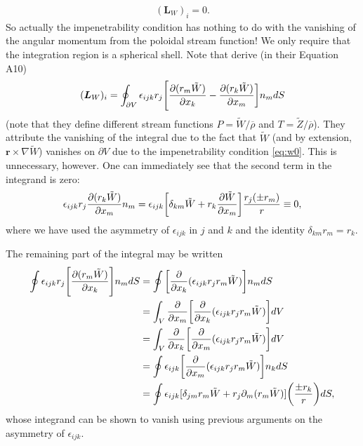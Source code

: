 \documentclass[12pt]{article} %
\newcommand{\pderiv}[2]{\frac{\partial#1}{\partial#2}}
\newcommand{\tz}{\tilde{Z}}
\newcommand{\tw}{\tilde{W}}
\newcommand{\rhobar}{\overline{\rho}}
\begin{document}
\begin{align}
(\bm{L}_W)_i = 0.
\label{eq:lw0}
\end{align}
So actually the impenetrability condition has nothing to do with the vanishing of the angular momentum from the poloidal stream function! We only require that the integration region is a spherical shell. Note that \citet{jones2011} derive (in their Equation A10)
\begin{align}
(\bm{L}_W)_i = \oint_{\partial V}\epsilon_{ijk}r_j\Bigg{[}\pderiv{(r_m\tw)}{x_k}-\pderiv{(r_k\tw)}{x_m}\bigg{]}n_mdS
\label{eq:jonesa10}
\end{align}
(note that they define different stream functions $P=\tw/\rhobar$ and $T=\tz/\rhobar$). They attribute the vanishing of the integral due to the fact that $\tw$ (and by extension, $\bm{r}\times\nabla\tw$) vanishes on $\partial V$ due to the impenetrability condition \eqref{eq:w0}. This is unnecessary, however. One can immediately see that the second term in the integrand is zero:
\begin{align*}
\epsilon_{ijk}r_j\pderiv{(r_k\tw)}{x_m}n_m = \epsilon_{ijk}\bigg{[}\delta_{km}\tw+r_k\pderiv{\tw}{x_m}\bigg{]}\frac{r_j(\pm r_m)}{r}\equiv 0,
\end{align*}
where we have used the asymmetry of $\epsilon_{ijk}$ in $j$ and $k$ and the identity $\delta_{km}r_m = r_k$.

The remaining part of the integral may be written
\begin{align*}
\oint\epsilon_{ijk}r_j\Bigg{[}\pderiv{(r_m\tw)}{x_k}\Bigg{]}n_mdS &= \oint\bigg{[}\pderiv{}{x_k}(\epsilon_{ijk}r_jr_m\tw)\bigg{]}n_mdS\\
&=\int_V\pderiv{}{x_m}\bigg{[}\pderiv{}{x_k}(\epsilon_{ijk}r_jr_m\tw)\bigg{]}dV\\
&= \int_V\pderiv{}{x_k}\bigg{[}\pderiv{}{x_m}(\epsilon_{ijk}r_jr_m\tw)\bigg{]}dV\\
&= \oint\epsilon_{ijk}\bigg{[}\pderiv{}{x_m}(\epsilon_{ijk}r_jr_m\tw)\bigg{]}n_kdS\\
&= \oint\epsilon_{ijk}[\delta_{jm}r_m\tw + r_j\partial_m(r_m\tw)]\bigg{(}\frac{\pm r_k}{r}\bigg{)}dS,
\end{align*} 
whose integrand can be shown to vanish using previous arguments on the asymmetry of $\epsilon_{ijk}$. 

	

\end{document}
